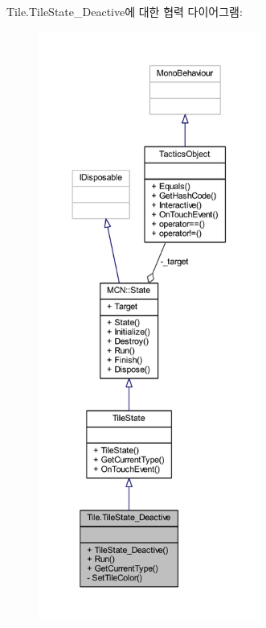 Tile.\+Tile\+State\+\_\+\+Deactive에 대한 협력 다이어그램\+:\nopagebreak
\begin{figure}[H]
\begin{center}
\leavevmode
\includegraphics[height=550pt]{class_tile_1_1_tile_state___deactive__coll__graph}
\end{center}
\end{figure}
